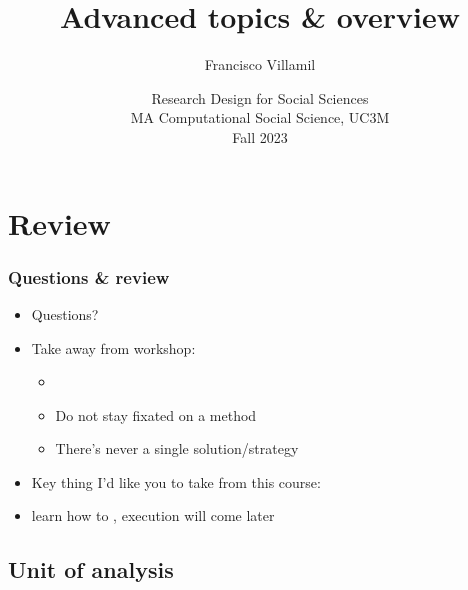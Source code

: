 \documentclass[aspectratio=43]{beamer}
\title[Lecture 5: Advanced topics]{\Large Advanced topics \& overview}
\author[]{Francisco Villamil}
\date[]{Research Design for Social Sciences\\MA Computational Social Science, UC3M\\Fall 2023}
\begin{document}

\begin{frame}
  \titlepage
\end{frame}

\section{Review}

\begin{frame}
\frametitle{Questions \& review}
\centering

\begin{itemize}
  \item Questions?
  \item<2-> Take away from workshop:
  \begin{itemize}
    \item {}
    \item Do not stay fixated on a method
    \item There's never a single solution/strategy
  \end{itemize}
  \item<3-> Key thing I'd like you to take from this course:
  \item<3->[] learn how to , execution will come later
\end{itemize}

\end{frame}

\subsection*{Unit of analysis}
\end{document}
